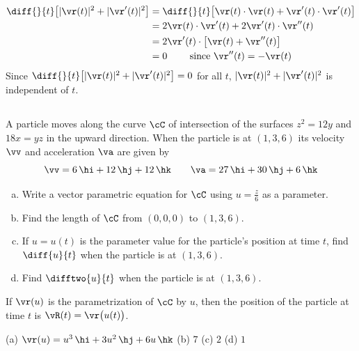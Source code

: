 \begin{solution}
\begin{align*}
\diff{}{t}\big[|\vr(t)|^2+|\vr'(t)|^2\big]
&=\diff{}{t}\big[\vr(t)\cdot\vr(t)+\vr'(t)\cdot\vr'(t)\big]\\
&=2\vr(t)\cdot\vr'(t)+2\vr'(t)\cdot\vr''(t)\\
&=2\vr'(t)\cdot\big[\vr(t)+\vr''(t)\big]\\
&=0\qquad \text{ since $\vr''(t)=-\vr(t)$ }
\end{align*}
Since $\diff{}{t}\big[|\vr(t)|^2+|\vr'(t)|^2\big]=0$ for all
$t$, $|\vr(t)|^2+|\vr'(t)|^2$ is independent of $t$.
\end{solution}




\subsection*{\Application}


\begin{question}[M317 2000A] %
 A particle moves along the curve $\cC$ of intersection of
the surfaces $z^2=12y$ and $18x=yz$ in the upward direction. When the particle
is at $(1,3,6)$ its velocity $\vv$ and acceleration $\va$ are given by
$$
\vv =6\,\hi+12\,\hj+12\,\hk\qquad
\va = 27\,\hi+30\,\hj+6\,\hk
$$
\begin{enumerate}[(a)]
\item
 Write a vector parametric equation for $\cC$ using 
$u=\frac{z}{6}$ as a parameter.
\item
 Find the length of $\cC$ from $(0,0,0)$ to $(1,3,6)$.
\item
 If $u=u(t)$ is the parameter value for the particle's position
at time $t$, find $\diff{u}{t}$ when the particle is at $(1,3,6)$.
\item
 Find $\difftwo{u}{t}$ when the particle is at $(1,3,6)$.
\end{enumerate}
\end{question}

\begin{hint} 
If $\vr(u)$ is the parametrization of $\cC$ by $u$, then
the position of the particle at time $t$ is $\vR(t) = \vr\big(u(t)\big)$.
\end{hint}

\begin{answer} 
(a)  $\vr(u)=u^3\,\hi+3u^2\,\hj+6u\,\hk$\qquad
(b)  $7$\qquad
(c)  $2$\qquad
(d)  $1$
\end{answer}

